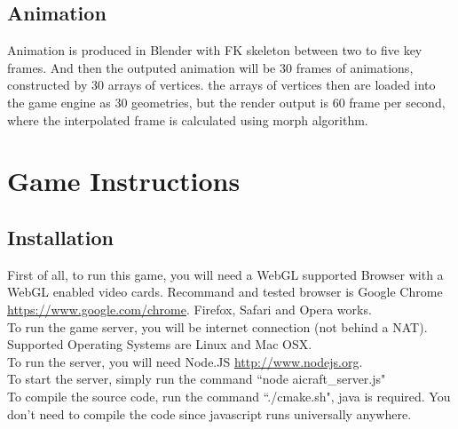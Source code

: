 \documentclass[12pt]{article}
\begin{document}
{\color{red}
\subsection{Animation}
Animation is produced in Blender with FK skeleton between two to five key frames. And then the outputed animation will be 30 frames of animations, constructed by 30 arrays of vertices. the arrays of vertices then are loaded into the game engine as 30 geometries, but the render output is 60 frame per second, where the interpolated frame is calculated using morph algorithm.
}

\section{Game Instructions}

\subsection{Installation}
First of all, to run this game, you will need a WebGL supported Browser with a WebGL enabled video cards. Recommand and tested browser is Google Chrome \url{https://www.google.com/chrome}. Firefox, Safari and Opera works.\\

To run the game server, you will be internet connection (not behind a NAT). Supported Operating Systems are Linux and Mac OSX.\\

To run the server, you will need Node.JS \url{http://www.nodejs.org}.\\

To start the server, simply run the command ``node aicraft\_server.js"\\

To compile the source code, run the command ``./cmake.sh", java is required. You don't need to compile the code since javascript runs universally anywhere.
\end{document}
